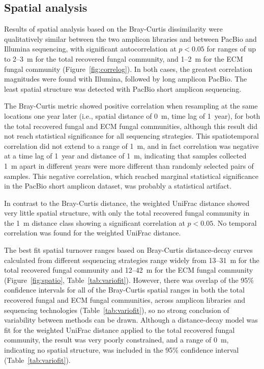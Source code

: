 \documentclass[
  12pt,
]{article}
\begin{document}
\hypertarget{spatial-analysis}{%
\subsection{Spatial analysis}\label{spatial-analysis}}

Results of spatial analysis based on the Bray-Curtis dissimilarity were qualitatively similar between the two amplicon libraries and between PacBio and Illumina sequencing, with significant autocorrelation at \(p < 0.05\) for ranges of up to 2--3~m for the total recovered fungal community, and 1--2~m for the ECM fungal community (Figure~\ref{fig:correlog}).
In both cases, the greatest correlation magnitudes were found with Illumina, followed by long amplicon PacBio.
The least spatial structure was detected with PacBio short amplicon sequencing.

The Bray-Curtis metric showed positive correlation when resampling at the same locations one year later (i.e., spatial distance of 0~m, time lag of 1~year), for both the total recovered fungal and ECM fungal communities, although this result did not reach statistical significance for all sequencing strategies.
This spatiotemporal correlation did not extend to a range of 1~m, and in fact correlation was negative at a time lag of 1~year and distance of 1~m, indicating that samples collected 1~m apart in different years were more different than randomly selected pairs of samples.
This negative correlation, which reached marginal statistical significance in the PacBio short amplicon dataset, was probably a statistical artifact.

In contrast to the Bray-Curtis distance, the weighted UniFrac distance showed very little spatial structure, with only the total recovered fungal community in the 1~m
distance class showing a significant correlation at \(p < 0.05\).
No temporal correlation was found for the weighted UniFrac distance.

The best fit spatial turnover ranges based on Bray-Curtis distance-decay curves calculated from different sequencing strategies range widely from 13--31~m for the total recovered fungal community and 12--42~m for the ECM fungal community (Figure~\ref{fig:spatio}, Table~\ref{tab:variofit}).
However, there was overlap of the 95\% confidence intervals for all of the Bray-Curtis spatial ranges in both the total recovered fungal and ECM fungal communities, across amplicon libraries and sequencing technologies (Table~\ref{tab:variofit}), so no strong conclusion of variability between methods can be drawn.
Although a distance-decay model was fit for the weighted UniFrac distance applied to the total recovered fungal community, the result was very poorly constrained, and a range of 0~m, indicating no spatial structure, was included in the 95\% confidence interval (Table~\ref{tab:variofit}).
\end{document}
